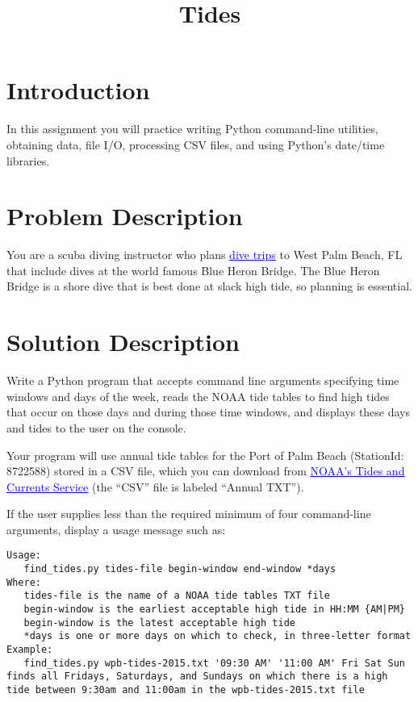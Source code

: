 \documentclass[12pt]{article}
\title{Tides}
\author{}
\date{}
\newcommand{\link}[2]{\href{#1}{\textcolor{blue}{\underline{#2}}}}
\begin{document}
\maketitle
\vspace{-1in}
\section{Introduction}

In this assignment you will practice writing Python command-line utilities, obtaining data, file I/O, processing CSV files, and using Python's date/time libraries.

\section{Problem Description}

You are a scuba diving instructor who plans \link{http://proscuba.training/trips.html}{dive trips} to West Palm Beach, FL that include dives at the world famous Blue Heron Bridge. The Blue Heron Bridge is a shore dive that is best done at slack high tide, so planning is essential.

\section{Solution Description}

Write a Python program that accepts command line arguments specifying time windows and days of the week, reads the NOAA tide tables to find high tides that occur on those days and during those time windows, and displays these days and tides to the user on the console.

Your program will use annual tide tables for the Port of Palm Beach (StationId: 8722588) stored in a CSV file, which you can download from \link{https://tidesandcurrents.noaa.gov/noaatidepredictions/NOAATidesFacade.jsp?Stationid=8722588}{NOAA's Tides and Currents Service} (the ``CSV'' file is labeled ``Annual TXT'').

If the user supplies less than the required minimum of four command-line arguments, display a usage message such as:

\begin{lstlisting}
Usage:
   find_tides.py tides-file begin-window end-window *days
Where:
   tides-file is the name of a NOAA tide tables TXT file
   begin-window is the earliest acceptable high tide in HH:MM {AM|PM}
   begin-window is the latest acceptable high tide
   *days is one or more days on which to check, in three-letter format
Example:
   find_tides.py wpb-tides-2015.txt '09:30 AM' '11:00 AM' Fri Sat Sun
finds all Fridays, Saturdays, and Sundays on which there is a high
tide between 9:30am and 11:00am in the wpb-tides-2015.txt file
\end{lstlisting}
\end{document}
